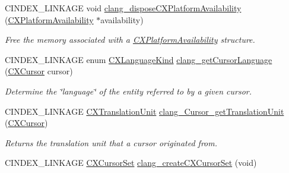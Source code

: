 \begin{DoxyCompactItemize}
C\+I\+N\+D\+E\+X\+\_\+\+L\+I\+N\+K\+A\+GE void \mbox{\hyperlink{group__CINDEX__CURSOR__MANIP_ga1acfac399add40f7240e02f9f5f1a6d9}{clang\+\_\+dispose\+C\+X\+Platform\+Availability}} (\mbox{\hyperlink{structCXPlatformAvailability}{C\+X\+Platform\+Availability}} $\ast$availability)
\begin{DoxyCompactList}\small\item\em Free the memory associated with a {\ttfamily \mbox{\hyperlink{structCXPlatformAvailability}{C\+X\+Platform\+Availability}}} structure. \end{DoxyCompactList}\item 
\mbox{\label{group__CINDEX__CURSOR__MANIP_ga3729a27620b08e32e331a6c168e707b3}} 
C\+I\+N\+D\+E\+X\+\_\+\+L\+I\+N\+K\+A\+GE enum \mbox{\hyperlink{group__CINDEX__CURSOR__MANIP_ga3abfddcec8a46e7156f37de661af3c14}{C\+X\+Language\+Kind}} \mbox{\hyperlink{group__CINDEX__CURSOR__MANIP_ga3729a27620b08e32e331a6c168e707b3}{clang\+\_\+get\+Cursor\+Language}} (\mbox{\hyperlink{structCXCursor}{C\+X\+Cursor}} cursor)
\begin{DoxyCompactList}\small\item\em Determine the \char`\"{}language\char`\"{} of the entity referred to by a given cursor. \end{DoxyCompactList}\item 
\mbox{\label{group__CINDEX__CURSOR__MANIP_ga529f1504710a41ce358d4e8c3161848d}} 
C\+I\+N\+D\+E\+X\+\_\+\+L\+I\+N\+K\+A\+GE \mbox{\hyperlink{group__CINDEX_gacdb7815736ca709ce9a5e1ec2b7e16ac}{C\+X\+Translation\+Unit}} \mbox{\hyperlink{group__CINDEX__CURSOR__MANIP_ga529f1504710a41ce358d4e8c3161848d}{clang\+\_\+\+Cursor\+\_\+get\+Translation\+Unit}} (\mbox{\hyperlink{structCXCursor}{C\+X\+Cursor}})
\begin{DoxyCompactList}\small\item\em Returns the translation unit that a cursor originated from. \end{DoxyCompactList}\item 
\mbox{\label{group__CINDEX__CURSOR__MANIP_gaf77146bb2008dee2d9a74d56e669945f}} 
C\+I\+N\+D\+E\+X\+\_\+\+L\+I\+N\+K\+A\+GE \mbox{\hyperlink{group__CINDEX__CURSOR__MANIP_gacca741976831fc313f80970cbf88307d}{C\+X\+Cursor\+Set}} \mbox{\hyperlink{group__CINDEX__CURSOR__MANIP_gaf77146bb2008dee2d9a74d56e669945f}{clang\+\_\+create\+C\+X\+Cursor\+Set}} (void)

\end{DoxyCompactItemize}
